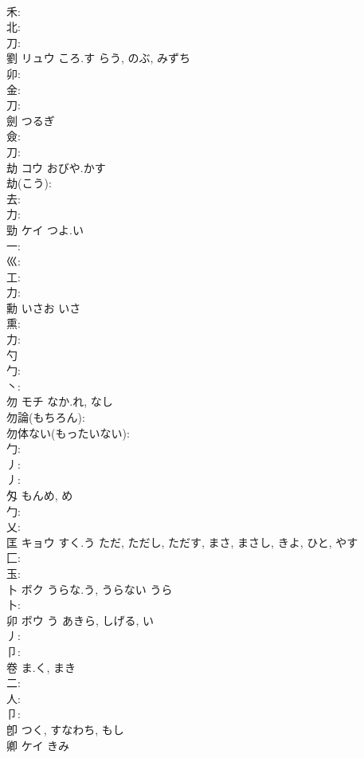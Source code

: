 \documentclass[8pt]{extreport}
\begin{document}
\begin{CJK}{UTF8}{min}
\\	禾: 
\\	北: 
\\	刀: 
\\	劉	リュウ	ころ.す	らう, のぶ, みずち	
\\	卯: 
\\	金: 
\\	刀: 
\\	劍		つるぎ				
\\	僉: 
\\	刀: 
\\	劫	コウ	おびや.かす		
\\	劫(こう): 
\\	去: 
\\	力: 
\\	勁	ケイ	つよ.い		
\\	一: 
\\	巛: 
\\	工: 
\\	力: 
\\	勳		いさお	いさ			
\\	熏: 
\\	力: 
\\	勺					
\\	勹: 
\\	丶: 
\\	勿	モチ	なか.れ, なし		
\\	勿論(もちろん): 
\\	勿体ない(もったいない): 
\\	勹: 
\\	丿: 
\\	丿: 
\\	匁		もんめ, め			
\\	勹: 
\\	乂: 
\\	匡	キョウ	すく.う	ただ, ただし, ただす, まさ, まさし, きよ, ひと, やす	
\\	匚: 
\\	玉: 
\\	卜	ボク	うらな.う, うらない	うら	
\\	卜: 
\\	卯	ボウ	う	あきら, しげる, い	
\\	丿: 
\\	卩: 
\\	卷		ま.く, まき				
\\	二: 
\\	人: 
\\	卩: 
\\	卽		つく, すなわち, もし				
\\	卿	ケイ	きみ		

\end{CJK}
\end{document}
